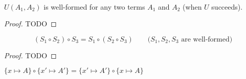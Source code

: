 \begin{proposition}
	~\\ \indent
	$U(A_1,A_2)$ is well-formed for any two terms $A_1$ and $A_2$
	(when $U$ succeeds).
\end{proposition}
\begin{proof}
	TODO
\end{proof}


\begin{theorem}
	\[(S_1\circ S_2) \circ S_3 = S_1 \circ (S_2 \circ S_3)
	\qquad\text{($S_1, S_2, S_3$ are well-formed)}
	\]
\end{theorem}
\begin{proof}
	TODO
\end{proof}


\begin{lemma}\label{lem:commsinglesinglesubst}
$ \{x\mapsto A\}\circ\{x'\mapsto A'\} = \{x'\mapsto A'\}\circ\{x\mapsto A\} $
\end{lemma}
